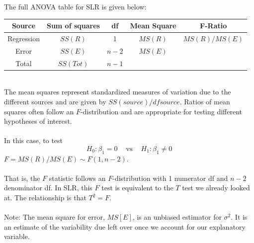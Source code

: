 \newpage


The full ANOVA table for SLR is given below:\\
\begin{tabular}{|c|c|c|c|c|} \hline
Source & Sum of squares & df & Mean Square & F-Ratio \\ \hline
Regression & $SS(R)$ & 1 & $MS(R)$ & $MS(R)/MS(E)$ \\
Error & $SS(E)$ & $n-2$ & $MS(E)$ &  \\
Total & $SS(Tot)$ & $n-1$ & &  \\ \hline
\end{tabular}

~\\
The mean squares represent standardized measures of variation due to the different sources and are given by $SS(source)/df source$.  Ratios of mean squares often follow an $F$-distribution and are appropriate for testing different hypotheses of interest.\\~\\
In this case, to test 
$$ H_0: \beta_1 = 0 \ \ \ \ \mbox{ vs }\ \ \ \ H_1:\beta_1 \neq 0$$
$F = MS(R)/MS(E) \sim F(1,n-2)$.\\~\\
That is, the $F$ statistic follows an $F$-distribution with 1 numerator df and $n-2$ denominator df.  In SLR, this $F$ test is equivalent to the $T$ test we already looked at.  The relationship is that $T^2=F$.  \\~\\
Note:  The mean square for error, $MS[E]$, is an unbiased estimator for $\sigma^2$.  It is an estimate of the variability due left over once we account for our explanatory variable.  

\newpage

